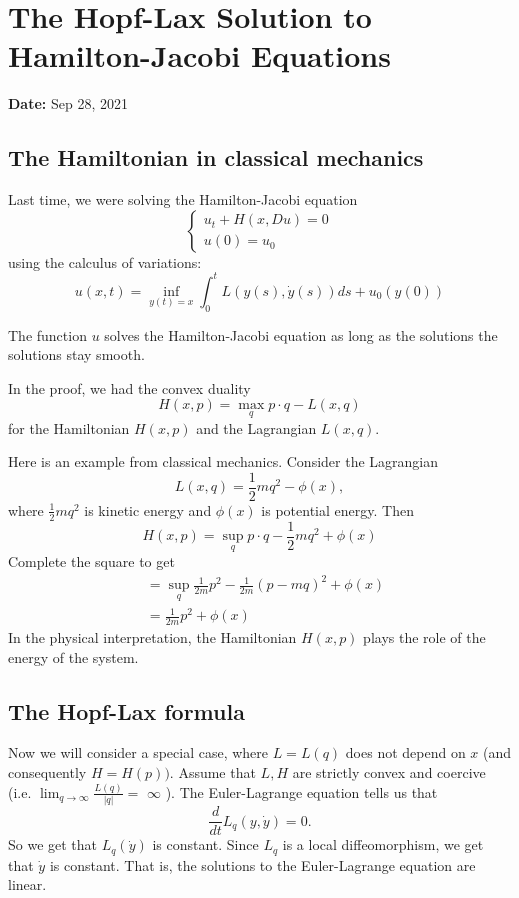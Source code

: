 \newpage
\section{The Hopf-Lax Solution to Hamilton-Jacobi Equations}
\textbf{Date:} Sep 28, 2021

\subsection{The Hamiltonian in classical mechanics}
Last time, we were solving the Hamilton-Jacobi equation
$$
\left\{\begin{array}{l}
u_{t}+H(x, D u)=0 \\
u(0)=u_{0}
\end{array}\right.
$$
using the calculus of variations:
$$
u(x, t)=\inf _{y(t)=x} \int_{0}^{t} L(y(s), \dot{y}(s)) d s+u_{0}(y(0))
$$

\begin{theorem}
The function $u$ solves the Hamilton-Jacobi equation as long as the solutions the solutions stay smooth.
\end{theorem}
In the proof, we had the convex duality
$$
H(x, p)=\max _{q} p \cdot q-L(x, q)
$$
for the Hamiltonian $H(x, p)$ and the Lagrangian $L(x, q)$.

\begin{example}
    Here is an example from classical mechanics. Consider the Lagrangian
    \[
        L(x, q)=\frac{1}{2} m q^{2}-\phi(x),
    \]
    where $\frac{1}{2} m q^{2}$ is kinetic energy and $\phi(x)$ is potential energy. Then
$$
H(x, p)=\sup _{q} p \cdot q-\frac{1}{2} m q^{2}+\phi(x)
$$
Complete the square to get
$$
\begin{aligned}
&=\sup _{q} \frac{1}{2 m} p^{2}-\frac{1}{2 m}(p-m q)^{2}+\phi(x) \\
&=\frac{1}{2 m} p^{2}+\phi(x)
\end{aligned}
$$
In the physical interpretation, the Hamiltonian $H(x, p)$ plays the role of the energy of the system.
\end{example}


\subsection{The Hopf-Lax formula}
Now we will consider a special case, where $L=L(q)$ does not depend on $x$ (and consequently $H=H(p)) .$ Assume that $L, H$ are strictly convex and coercive (i.e. $\lim _{q \rightarrow \infty} \frac{L(q)}{|q|}=$ $\infty$ ). The Euler-Lagrange equation tells us that
\[
    \frac{d}{dt}L_q(y,\dot y) = 0.
\]
So we get that $L_{q}(\dot{y})$ is constant. Since $L_{q}$ is a local diffeomorphism, we get that $\dot{y}$ is constant. That is, the solutions to the Euler-Lagrange equation are linear.

